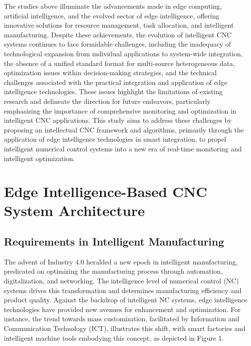 \documentclass[preprint,12pt]{elsarticle}
\begin{document}
The studies above illuminate the advancements made in edge computing, artificial intelligence, and the evolved sector of edge intelligence, offering innovative solutions for resource management, task allocation, and intelligent manufacturing. Despite these achievements, the evolution of intelligent CNC systems continues to face formidable challenges, including the inadequacy of technological expansion from individual applications to system-wide integration, the absence of a unified standard format for multi-source heterogeneous data, optimization issues within decision-making strategies, and the technical challenges associated with the practical integration and application of edge intelligence technologies. These issues highlight the limitations of existing research and delineate the direction for future endeavors, particularly emphasizing the importance of comprehensive monitoring and optimization in intelligent CNC applications. This study aims to address these challenges by proposing an intellectual CNC framework and algorithms, primarily through the application of edge intelligence technologies in smart integration, to propel intelligent numerical control systems into a new era of real-time monitoring and intelligent optimization.

\section{Edge Intelligence-Based CNC System Architecture}
\subsection{Requirements in Intelligent Manufacturing}

The advent of Industry 4.0 heralded a new epoch in intelligent manufacturing, predicated on optimizing the manufacturing process through automation, digitalization, and networking\cite{el2021design}. The intelligence level of numerical control (NC) systems drives this transformation and determines manufacturing efficiency and product quality\cite{yao2019design}. Against the backdrop of intelligent NC systems, edge intelligence technologies have provided new avenues for enhancement and optimization\cite{zhang2022information}. For instance, the trend towards mass customization, facilitated by Information and Communication Technology (ICT), illustrates this shift, with smart factories and intelligent machine tools embodying this concept\cite{kosmowski2022integrated,chen2017smart,lee2020review}, as depicted in Figure 1.
\end{document}
